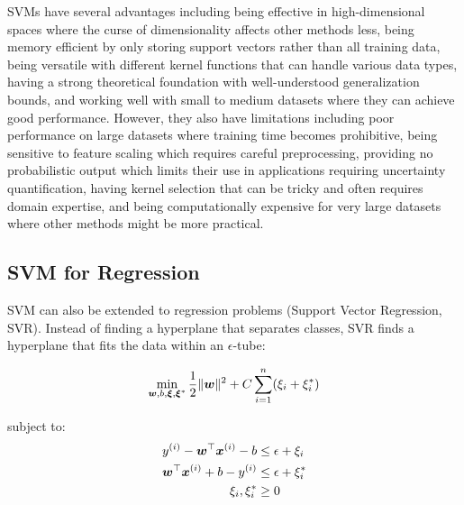 SVMs have several advantages including being effective in high-dimensional spaces where the curse of dimensionality affects other methods less, being memory efficient by only storing support vectors rather than all training data, being versatile with different kernel functions that can handle various data types, having a strong theoretical foundation with well-understood generalization bounds, and working well with small to medium datasets where they can achieve good performance. However, they also have limitations including poor performance on large datasets where training time becomes prohibitive, being sensitive to feature scaling which requires careful preprocessing, providing no probabilistic output which limits their use in applications requiring uncertainty quantification, having kernel selection that can be tricky and often requires domain expertise, and being computationally expensive for very large datasets where other methods might be more practical.

\subsection{SVM for Regression}

SVM can also be extended to regression problems (Support Vector Regression, SVR). Instead of finding a hyperplane that separates classes, SVR finds a hyperplane that fits the data within an $\epsilon$-tube:

\begin{equation}
\min_{\boldsymbol{w}, b, \boldsymbol{\xi}, \boldsymbol{\xi}^*} \frac{1}{2}\|\boldsymbol{w}\|^2 + C \sum_{i=1}^{n} (\xi_i + \xi_i^*)
\end{equation}

subject to:
\begin{align}
y^{(i)} - \boldsymbol{w}^\top \boldsymbol{x}^{(i)} - b &\leq \epsilon + \xi_i \\
\boldsymbol{w}^\top \boldsymbol{x}^{(i)} + b - y^{(i)} &\leq \epsilon + \xi_i^* \\
\xi_i, \xi_i^* &\geq 0
\end{align}

